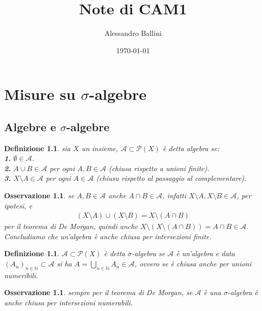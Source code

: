 \documentclass[oneside, 11pt]{amsbook}
\newcommand{\0}{{(0)}}
\newcommand{\3}{{(3)}}
\theoremstyle{colonplain}
\theoremstyle{colondefinition}
\newtheorem{defn}[thm]{Definizione}
\theoremstyle{colonremark}
\newtheorem{rmk}[thm]{Osservazione}
\numberwithin{equation}{chapter}
\begin{document}
\date{\today}
\author{Alessandro Ballini}


\title{Note di CAM1}

\maketitle
\tableofcontents

\chapter{Misure su $\sigma$-algebre}
\section{Algebre e $\sigma$-algebre}
\begin{defn}
sia $X$ un insieme, $\mathcal{A} \subset \mathcal{P}(X)$ è detta \textit{algebra} se: \\
\textbf{1.} $\emptyset \in \mathcal{A}$. \\
\textbf{2.} $A \cup B \in \mathcal{A}$ per ogni $A, B \in \mathcal{A}$ (chiusa rispetto a unioni finite). \\
\textbf{3.} $X \setminus A \in \mathcal{A}$ per ogni $A \in \mathcal{A}$ (chiusu rispetto al passaggio al complementare).
\end{defn}
\begin{rmk}
se $A, B \in \mathcal{A}$ anche $A \cap B \in \mathcal{A}$, infatti $X \setminus A, X \setminus B \in \mathcal{A}$, per ipotesi, e
\begin{align}
    (X \setminus A) \cup (X \setminus B) = X \setminus (A \cap B)
\end{align}
per il \textit{teorema di De Morgan}, quindi anche $X \setminus (X \setminus (A \cap B)) = A \cap B \in \mathcal{A}$. Concludiamo che un'algebra è anche chiusa per intersezioni finite.
\end{rmk}
\begin{defn}
$\mathcal{A} \subset \mathcal{P}(X)$ è detta $\sigma$-\textit{algebra} se $\mathcal{A}$ è un'algebra e data $(A_n)_{n \in \mathbb{N}} \subset \mathcal{A}$ si ha $A = \bigcup_{n \in \mathbb{N}} A_n \in \mathcal{A}$, ovvero se è chiusa anche per unioni numeribili.
\end{defn}
\begin{rmk}
sempre per il \textit{teorema di De Morgan}, se $\mathcal{A}$ è una $\sigma$-algebra è anche chiusa per intersezioni numerabili.
\end{rmk}
\end{document}

